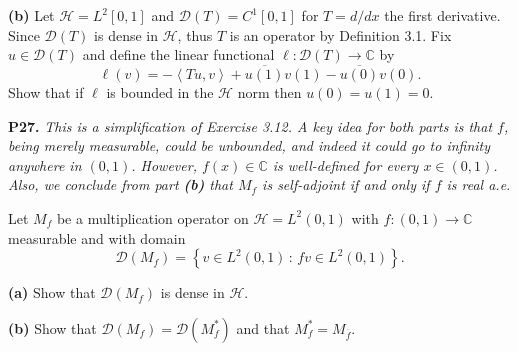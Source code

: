 \documentclass[12pt]{amsart}
\newcommand{\cD}{\mathcal{D}}
\newcommand{\cH}{\mathcal{H}}
\newcommand{\CC}{\mathbb{C}}
\newcommand{\ip}[2]{\ensuremath{\left<#1,#2\right>}}
\newcommand{\prob}[1]{\bigskip\noindent\textbf{#1.}\quad }
\newcommand{\epart}[1]{\medskip\noindent\textbf{(#1)}\quad }
\begin{document}
\epart{b} Let $\cH=L^2[0,1]$ and $\cD(T) = C^1[0,1]$ for $T = d/dx$ the first derivative.  Since $\cD(T)$ is dense in $\cH$, thus $T$ is an operator by Definition 3.1.  Fix $u\in\cD(T)$ and define the linear functional $\ell:\cD(T)\to\CC$ by
	$$\ell(v) = - \ip{Tu}{v} + \overline{u(1)} v(1) - \overline{u(0)} v(0).$$
Show that if $\ell$ is bounded in the $\cH$ norm then $u(0)=u(1)=0$.


\prob{P27}  \emph{This is a simplification of Exercise 3.12.  A key idea for both parts is that $f$, being merely measurable, could be unbounded, and indeed it could go to infinity anywhere in $(0,1)$.  However, $f(x)\in\CC$ is well-defined for every $x\in(0,1)$.  Also, we conclude from part \emph{\textbf{(b)}} that $M_f$ is self-adjoint if and only if $f$ is real a.e.}

\medskip \noindent Let $M_f$ be a multiplication operator on $\cH=L^2(0,1)$ with $f:(0,1)\to\CC$ measurable and with domain
	$$\cD(M_f) = \left\{v \in L^2(0,1)\,:\,fv \in L^2(0,1)\right\}.$$

\epart{a}  Show that $\cD(M_f)$ is dense in $\cH$.

\epart{b}  Show that $\cD(M_f) = \cD(M_f^*)$ and that $M_f^* = M_{\overline{f}}$.
\end{document}
